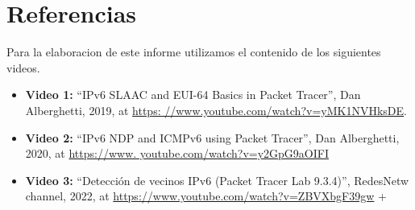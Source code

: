 \documentclass[a4paper,12pt]{article}
\begin{document}
\section{Referencias}
Para la elaboracion de este informe utilizamos el contenido de los siguientes videos. 
\begin{itemize}
  \item \textbf{Video 1:} “IPv6 SLAAC and EUI-64 Basics in Packet Tracer”, Dan Alberghetti, 2019, at \url{https:
  //www.youtube.com/watch?v=yMK1NVHksDE}.
  \item \textbf{Video 2:} “IPv6 NDP and ICMPv6 using Packet Tracer”, Dan Alberghetti, 2020, at \url{https://www.
  youtube.com/watch?v=y2GpG9aOIFI}
  \item \textbf{Video 3:} “Detección de vecinos IPv6 (Packet Tracer Lab 9.3.4)”, RedesNetw channel, 2022, at \url{https://www.youtube.com/watch?v=ZBVXbgF39gw}
+\end{itemize}
\end{document}
